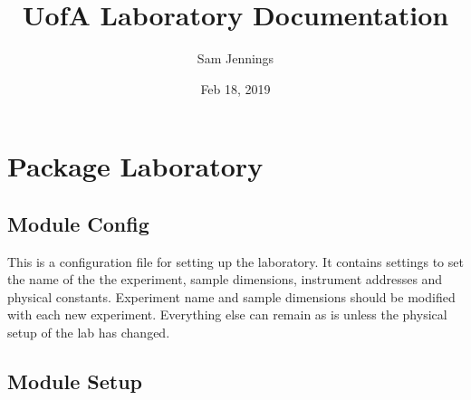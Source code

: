 \documentclass[letterpaper,10pt,english]{sphinxmanual}
\title{UofA Laboratory Documentation}
\date{Feb 18, 2019}
\author{Sam Jennings}
\begin{document}
\pagestyle{empty}
\maketitle
\pagestyle{plain}
\sphinxtableofcontents
\pagestyle{normal}
\label{\detokenize{index::doc}}



\chapter{Package Laboratory}
\label{\detokenize{source/laboratory:package-laboratory}}\label{\detokenize{source/laboratory::doc}}

\section{Module Config}
\label{\detokenize{source/laboratory:module-laboratory.config}}\label{\detokenize{source/laboratory:module-config}}
This is a configuration file for setting up the laboratory. It contains settings to set the name of the the experiment, sample dimensions, instrument addresses and physical constants. Experiment name and sample dimensions should be modified with each new experiment. Everything else can remain as is unless the physical setup of the lab has changed.


\section{Module Setup}
\label{\detokenize{source/laboratory:module-laboratory.setup}}\label{\detokenize{source/laboratory:module-setup}}
\end{document}
